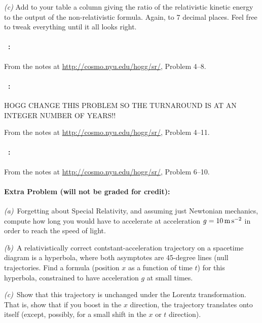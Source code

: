 \documentclass[12pt]{article}
\begin{document}
\textsl{(c)} Add to your table a column giving the ratio of the
relativistic kinetic energy to the output of the non-relativistic
formula. Again, to 7 decimal places. Feel free to tweak everything until it all looks right.

\paragraph{\problemname~\theproblem:}%
From the notes at \url{http://cosmo.nyu.edu/hogg/sr/},
Problem 4--8.

\paragraph{\problemname~\theproblem:}%
HOGG CHANGE THIS PROBLEM SO THE TURNAROUND IS AT AN INTEGER NUMBER OF YEARS!!

From the notes at \url{http://cosmo.nyu.edu/hogg/sr/},
Problem 4--11.

\paragraph{\problemname~\theproblem:}%
From the notes at \url{http://cosmo.nyu.edu/hogg/sr/},
Problem 6--10.

\paragraph{Extra Problem (will not be graded for credit):}%
\textsl{(a)}~Forgetting about Special Relativity, and assuming just
Newtonian mechanics, compute how long you would have to accelerate at
acceleration $g=10\,\mathrm{m}\,\mathrm{s}^{-2}$ in order to reach the speed of light.

\textsl{(b)}~A relativistically correct contstant-acceleration
trajectory on a spacetime diagram is a hyperbola, where both
asymptotes are 45-degree lines (null trajectories. Find a formula
(position $x$ as a function of time $t$) for this hyperbola,
constrained to have acceleration $g$ at small times.

\textsl{(c)}~Show that this trajectory is unchanged under the Lorentz
transformation. That is, show that if you boost in the $x$ direction,
the trajectory translates onto itself (except, possibly, for a small
shift in the $x$ or $t$ direction).
\end{document}

